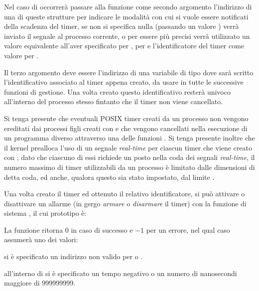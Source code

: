 
Nel caso di  occorrerà passare alla funzione come secondo
argomento l'indirizzo di una di queste strutture per indicare le modalità con
cui si vuole essere notificati della scadenza del timer, se non si specifica
nulla (passando un valore ) verrà inviato il segnale
 al processo corrente, o per essere più precisi verrà
utilizzato un valore equivalente all'aver specificato 
per ,  per  e
l'identificatore del timer come valore per .

Il terzo argomento deve essere l'indirizzo di una variabile di tipo
 dove sarà scritto l'identificativo associato al timer appena
creato, da usare in tutte le successive funzioni di gestione. Una volta creato
questo identificativo resterà univoco all'interno del processo stesso fintanto
che il timer non viene cancellato.

Si tenga presente che eventuali POSIX timer creati da un processo non vengono
ereditati dai processi figli creati con  e che vengono cancellati
nella esecuzione di un programma diverso attraverso una delle funzioni
. Si tenga presente inoltre che il kernel prealloca l'uso di un
segnale \textit{real-time} per ciascun timer che viene creato con
; dato che ciascuno di essi richiede un posto nella coda
dei segnali \textit{real-time}, il numero massimo di timer utilizzabili da un
processo è limitato dalle dimensioni di detta coda, ed anche, qualora questo
sia stato impostato, dal limite .

Una volta creato il timer  ed ottenuto il relativo
identificatore, si può attivare o disattivare un allarme (in gergo
\textsl{armare} o \textsl{disarmare} il timer) con la funzione di sistema
, il cui prototipo è:

\begin{funcproto}{
}

{La funzione ritorna $0$ in caso di successo e $-1$ per un errore, nel qual
  caso  assumerà uno dei valori: 
  \begin{errlist}
  \item[\errcode{EFAULT}] si è specificato un indirizzo non valido
    per  o .
  \item[\errcode{EINVAL}] all'interno di  si è
    specificato un tempo negativo o un numero di nanosecondi maggiore di
    999999999.
  \end{errlist}
}
\end{funcproto}

